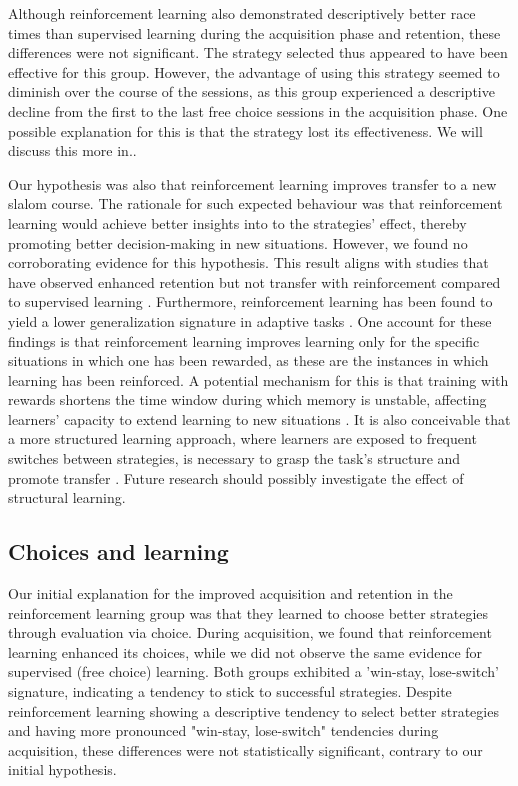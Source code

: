 \documentclass{article}
\begin{document}
Although reinforcement learning also demonstrated descriptively better race times than supervised learning during the acquisition phase and retention, these differences were not significant. The strategy selected thus appeared to have been effective for this group. However, the advantage of using this strategy seemed to diminish over the course of the sessions, as this group experienced a descriptive decline from the first to the last free choice sessions in the acquisition phase. One possible explanation for this is that the strategy lost its effectiveness. We will discuss this more in..

Our hypothesis was also that reinforcement learning improves transfer to a new slalom course. The rationale for such expected behaviour was that reinforcement learning would achieve better insights into to the strategies' effect, thereby promoting better decision-making in new situations. However, we found no corroborating evidence for this hypothesis. This result aligns with studies that have observed enhanced retention but not transfer with reinforcement compared to supervised learning \cite{hasson_reinforcement_2015}. Furthermore, reinforcement learning has been found to yield a lower generalization signature in adaptive tasks \cite{lior_shmuelof_overcoming_2012}. One account for these findings is that reinforcement learning improves learning only for the specific situations in which one has been rewarded, as these are the instances in which learning has been reinforced. A potential mechanism for this is that training with rewards shortens the time window during which memory is unstable, affecting learners' capacity to extend learning to new situations \cite{robertson_memory_2018}. It is also conceivable that a more structured learning approach, where learners are exposed to frequent switches between strategies, is necessary to grasp the task's structure and promote transfer \cite{braun_structure_2010}. Future research should possibly investigate the effect of structural learning. 

\subsection{Choices and learning}
Our initial explanation for the improved acquisition and retention in the reinforcement learning group was that they learned to choose better strategies through evaluation via choice. During acquisition, we found that reinforcement learning enhanced its choices, while we did not observe the same evidence for supervised (free choice) learning. Both groups exhibited a 'win-stay, lose-switch' signature, indicating a tendency to stick to successful strategies. Despite reinforcement learning showing a descriptive tendency to select better strategies and having more pronounced "win-stay, lose-switch" tendencies during acquisition, these differences were not statistically significant, contrary to our initial hypothesis. 
\end{document}
